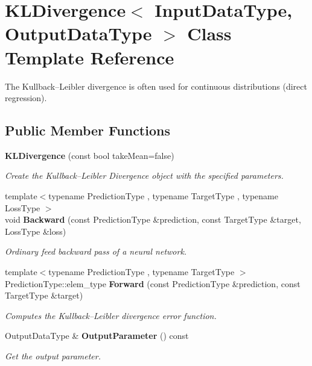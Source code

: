 \section{K\+L\+Divergence$<$ Input\+Data\+Type, Output\+Data\+Type $>$ Class Template Reference}
\label{classmlpack_1_1ann_1_1KLDivergence}


The Kullback–\+Leibler divergence is often used for continuous distributions (direct regression).  


\subsection*{Public Member Functions}
\begin{DoxyCompactItemize}
\item 
\textbf{ K\+L\+Divergence} (const bool take\+Mean=false)
\begin{DoxyCompactList}\small\item\em Create the Kullback–\+Leibler Divergence object with the specified parameters. \end{DoxyCompactList}\item 
{\footnotesize template$<$typename Prediction\+Type , typename Target\+Type , typename Loss\+Type $>$ }\\void \textbf{ Backward} (const Prediction\+Type \&prediction, const Target\+Type \&target, Loss\+Type \&loss)
\begin{DoxyCompactList}\small\item\em Ordinary feed backward pass of a neural network. \end{DoxyCompactList}\item 
{\footnotesize template$<$typename Prediction\+Type , typename Target\+Type $>$ }\\Prediction\+Type\+::elem\+\_\+type \textbf{ Forward} (const Prediction\+Type \&prediction, const Target\+Type \&target)
\begin{DoxyCompactList}\small\item\em Computes the Kullback–\+Leibler divergence error function. \end{DoxyCompactList}\item 
Output\+Data\+Type \& \textbf{ Output\+Parameter} () const
\begin{DoxyCompactList}\small\item\em Get the output parameter. \end{DoxyCompactList}\item 

\end{DoxyCompactItemize}
